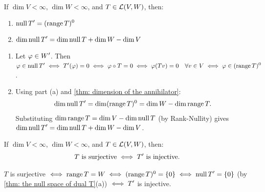 \begin{thm}
  \label{thm: the null space of dual T}
  If $\dim V < \infty$, $\dim W<\infty$, and $T \in \mathcal{L} (V,W)$, then:
  \begin{enumerate}[label=\textbf{(\alph*)}]
    \item $\operatorname{null} \displaystyle T' = (\operatorname{range} T)^0$
    \item $\dim \operatorname{null} \displaystyle T' = \dim \operatorname{null} T + \dim W - \dim V$
  \end{enumerate}
\end{thm}
\begin{prf}
  \begin{enumerate}[label=\textbf{(\alph*)}]
    \item Let $\varphi \in \displaystyle W'$. Then $\varphi \in \operatorname{null} \displaystyle T' \iff \displaystyle T'(\varphi) = 0 \iff \varphi \circ T = 0 \iff \varphi(Tv) = 0 \quad \forall v \in V \iff \varphi \in (\operatorname{range} T)^0$.
    \item Using part (a) and \ref{thm: dimension of the annihilator}:
    \begin{equation}
      \dim \operatorname{null} \displaystyle T' = \dim (\operatorname{range} T)^0 = \dim W - \dim \operatorname{range} T.
    \end{equation}
    Substituting $\dim \operatorname{range} T = \dim V - \dim \operatorname{null} T$ (by Rank-Nullity) gives $\dim \operatorname{null} \displaystyle T' = \dim \operatorname{null} T + \dim W - \dim V$.
  \end{enumerate}
  \vspace{-\baselineskip}
\end{prf}

\begin{thm}
  \label{thm: T surjective iff dual T injective}
  If $\dim V < \infty$, $\dim W<\infty$, and $T \in \mathcal{L} (V,W)$, then:
  \begin{equation}
    T \text{ is surjective} \iff \displaystyle T' \text{ is injective.}
  \end{equation}
\end{thm}
\begin{prf}
  $T$ is surjective $\iff \operatorname{range} T = W \iff (\operatorname{range} T)^0 = \{0\} \iff \operatorname{null} \displaystyle T' = \{0\}$ (by \ref{thm: the null space of dual T}(a)) $\iff \displaystyle T'$ is injective.
\end{prf}

